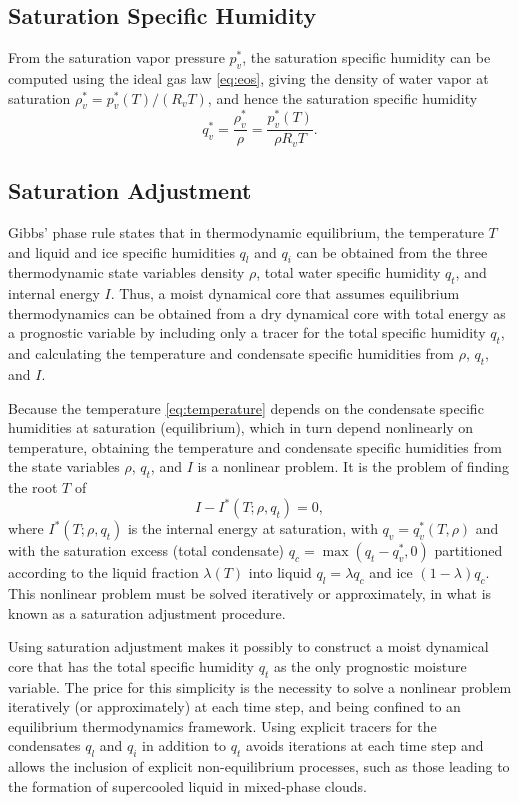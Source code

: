 \documentclass{article}
\begin{document}
\subsection{Saturation Specific Humidity}
\label{sct:sat_spef_hum}
From the saturation vapor pressure $p_v^*$, the saturation specific humidity can be computed using the ideal gas law \eqref{eq:eos}, giving the density of water vapor at saturation $\rho_v^* = p_v^*(T)/(R_v T)$, and hence the saturation specific humidity 
\begin{equation}\label{eq:sat_shum}
     q_v^* = \frac{\rho_v^*}{\rho} = \frac{p_v^*(T)}{\rho R_v T}.
\end{equation}

\subsection{Saturation Adjustment}
\label{sct:sat_adj}
Gibbs' phase rule states that in thermodynamic equilibrium, the temperature $T$ and liquid and ice specific humidities $q_l$ and $q_i$ can be obtained from the three thermodynamic state variables density $\rho$, total water specific humidity $q_t$, and internal energy $I$. Thus, a moist dynamical core that assumes equilibrium thermodynamics can be obtained from a dry dynamical core with total energy as a prognostic variable by including only a tracer for the total specific humidity $q_t$, and calculating the temperature and condensate specific humidities from $\rho$, $q_t$, and $I$. 

Because the temperature \eqref{eq:temperature} depends on the condensate specific humidities at saturation (equilibrium), which in turn depend nonlinearly on temperature, obtaining the temperature and condensate specific humidities from the state variables $\rho$, $q_t$, and $I$ is a nonlinear problem. It is the problem of finding the root $T$ of
\begin{equation}\label{e:sat_adjustment}
I - I^*(T; \rho, q_t) = 0,
\end{equation}
where $I^*(T; \rho, q_t)$ is the internal energy at saturation, with $q_v = q_v^*(T, \rho)$ and with the saturation excess (total condensate) $q_c = \max(q_t - q_v^*, 0)$ partitioned according to the liquid fraction $\lambda(T)$ into liquid $q_l = \lambda q_c$ and ice $(1-\lambda)q_c$. This nonlinear problem must be solved iteratively or approximately, in what is known as a saturation adjustment procedure. 

Using saturation adjustment makes it possibly to construct a moist dynamical core that has the total specific humidity $q_t$ as the only prognostic moisture variable. The price for this simplicity is the necessity to solve a nonlinear problem iteratively (or approximately) at each time step, and being confined to an equilibrium thermodynamics framework. Using explicit tracers for the condensates $q_l$ and $q_i$ in addition to $q_t$ avoids iterations at each time step and allows the inclusion of explicit non-equilibrium processes, such as those leading to the formation of supercooled liquid in mixed-phase clouds. 
\end{document}
